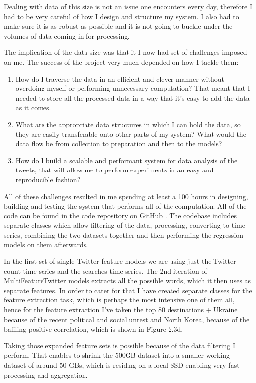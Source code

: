 \documentclass[minf,twoside,singlespacing,parskip,frontabs,notimes,11pt]{infthesis}
\begin{document}
Dealing with data of this size is not an issue one encounters every day, therefore I had to be very careful of how I design and structure my system. I also had to make sure it is as robust as possible and it is not going to buckle under the volumes of data coming in for processing.


The implication of the data size was that it I now had set of challenges imposed on me.  The success of the project very much depended on how I tackle them:
\begin{enumerate}
\item How do I traverse the data in an efficient and clever manner without overdoing myself or performing unnecessary computation? That meant that I needed to store all the processed data in a way that it's easy to add the data as it comes.
\item What are the appropriate data structures in which I can hold the data, so they are easily transferable onto other parts of my system? What would the data flow be from collection to preparation and then to the models?
\item How do I build a scalable and performant system for data analysis of the tweets, that will allow me to perform experiments in an easy and reproducible fashion?
\end{enumerate}


All of these challenges resulted in me spending at least a 100 hours in designing, building and testing the system that performs all of the computation. All of the code can be found in the code repository on GitHub \cite{code}. The codebase includes separate classes which allow filtering of the data, processing, converting to time series, combining the two datasets together and then performing the regression models on them afterwards. 


In the first set of single Twitter feature models we are using just the Twitter count time series and the searches time series. The 2nd iteration of MultiFeatureTwitter models extracts all the possible words, which it then uses as separate features. In order to cater for that I have created separate classes for the feature extraction task, which is perhaps the most intensive one of them all, hence for the feature extraction I've taken the top 80 destinations + Ukraine because of the recent political and social unrest and North Korea, because of the baffling positive correlation, which is shown in Figure 2.3d.

Taking those expanded feature sets is possible because of the data filtering I perform. That enables to shrink the 500GB dataset into a smaller working dataset of around 50 GBs, which is residing on a local SSD enabling very fast processing and aggregation. 
\end{document}
